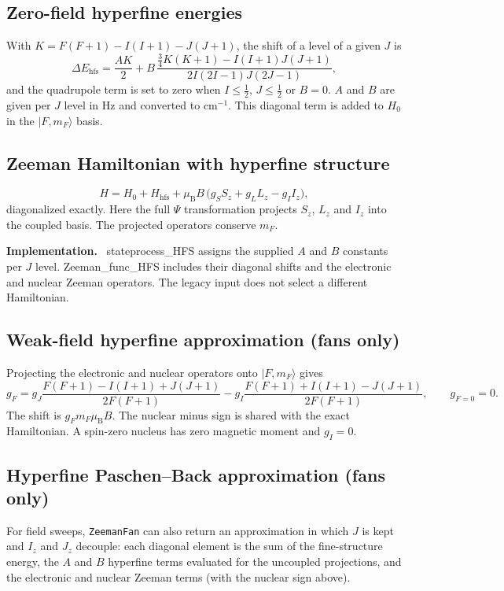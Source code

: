 \documentclass[11pt,a4paper]{article}
\newcommand{\code}[1]{\texttt{#1}}
\newcommand{\routine}[1]{\textsf{#1}}
\newcommand{\opt}[1]{\texttt{\detokenize{#1}}}
\newenvironment{implnote}[1][Implementation]{%
  \par\smallskip\noindent\begin{lrbox}{\notebox}\setlength{\fboxsep}{6pt}\begin{minipage}{\dimexpr\linewidth-2\fboxsep-2\fboxrule\relax}\small\textbf{#1.}\ }{%
  \end{minipage}\end{lrbox}\setlength{\fboxsep}{6pt}\fcolorbox{noteframe}{notebg}{\usebox{\notebox}}\par\smallskip}
\numberwithin{equation}{section}
\newcommand{\muB}{\mu_{\mathrm B}}
\begin{document}
\subsection{Zero-field hyperfine energies}
With $K=F(F+1)-I(I+1)-J(J+1)$, the shift of a level of a given $J$ is
\begin{equation}
\Delta E_{\mathrm{hfs}} = \frac{A K}{2}
 + B\,\frac{\tfrac34 K(K+1)-I(I+1)J(J+1)}{2I(2I-1)J(2J-1)},
\end{equation}
and the quadrupole term is set to zero when $I\le\tfrac12$, $J\le\tfrac12$ or $B=0$. $A$ and $B$ are given per $J$ level in Hz and converted to cm$^{-1}$. This diagonal term is added to $H_0$ in the $\vert F,m_F\rangle$ basis.

\subsection{Zeeman Hamiltonian with hyperfine structure}
\begin{equation}
H = H_0 + H_{\mathrm{hfs}} + \muB B\,\bigl(g_S S_z + g_L L_z - g_I I_z\bigr),
\end{equation}
diagonalized exactly. Here the full $\Psi$ transformation projects $S_z$, $L_z$ and $I_z$ into the coupled basis. The projected operators conserve $m_F$.

\begin{implnote}
\routine{stateprocess\_HFS} assigns the supplied $A$ and $B$ constants
per $J$ level. \routine{Zeeman\_func\_HFS} includes their diagonal shifts
and the electronic and nuclear Zeeman operators. The legacy
\opt{PsiHFS} input does not select a different Hamiltonian.
\end{implnote}

\subsection{Weak-field hyperfine approximation (fans only)}
Projecting the electronic and nuclear operators onto $\vert F,m_F\rangle$ gives
\begin{equation}
g_F = g_J\frac{F(F+1)-I(I+1)+J(J+1)}{2F(F+1)}
      -g_I\frac{F(F+1)+I(I+1)-J(J+1)}{2F(F+1)},\qquad g_{F=0}=0.
\end{equation}
The shift is $g_F m_F\muB B$. The nuclear minus sign is shared with the exact Hamiltonian. A spin-zero nucleus has zero magnetic moment and $g_I=0$.

\subsection{Hyperfine Paschen--Back approximation (fans only)}
For field sweeps, \code{ZeemanFan} can also return an approximation in which $J$ is kept and $I_z$ and $J_z$ decouple: each diagonal element is the sum of the fine-structure energy, the $A$ and $B$ hyperfine terms evaluated for the uncoupled projections, and the electronic and nuclear Zeeman terms (with the nuclear sign above).
\end{document}
